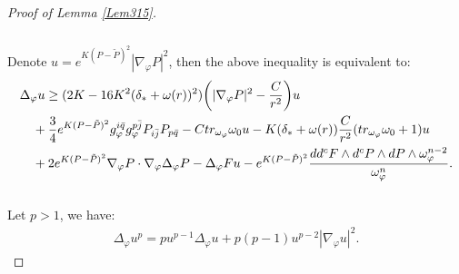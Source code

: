 \documentclass[11pt]{amsart}
\numberwithin{equation}{section}
\begin{document}
\begin{proof}[Proof of Lemma \ref{Lem315}]
\begin{align}
\end{align}\\
Denote $u=e^{K(P-\tilde{P})^2}|\nabla_{\varphi}P|^2$,  then the above inequality is equivalent to:
\begin{align}\label{4.133New}
	&\Delta_{\varphi}u  \ge  (2K-16K^2(\delta_*+\omega(r))^2)\bigg( |\nabla_\varphi P|^2 - \frac{C}{r^2}\bigg) u    \notag \\
	&\quad +\frac{3}{4}e^{K(P-\tilde P)^2} g_{\varphi}^{i\bar{q}}g_{\varphi}^{p\bar{j}}P_{i\bar{j}}P_{p\bar{q}} -C tr_{\omega_{\varphi}}\omega_0 u -K(\delta_*+\omega(r)) \frac{C}{r^2} (tr_{\omega_{\varphi}}\omega_0+1) u \notag\\
	&\quad+2e^{K(P-\tilde P)^2}\nabla_{\varphi}P\cdot\nabla_{\varphi}\Delta_{\varphi}P - \Delta_{\varphi}Fu - e^{K(P-\tilde P)^2}\frac{dd^cF\wedge d^cP\wedge dP\wedge \omega_{\varphi}^{n-2}}{\omega_{\varphi}^n}.
\end{align}\\

\noindent
Let $p>1$,  we have:
\begin{align}
	\Delta_\varphi u^p = p u^{p-1}\Delta_\varphi u+p(p-1)u^{p-2}|\nabla_\varphi u|^2.
\end{align}


\end{proof}
\end{document}
